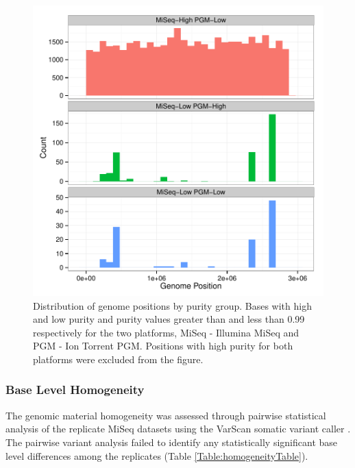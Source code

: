 \documentclass[smallextended]{svjour3}\usepackage[]{graphicx}\usepackage[]{color}
\makeatletter
\def\maxwidth{ %
  \ifdim\Gin@nat@width>\linewidth
    \linewidth
  \else
    \Gin@nat@width
  \fi
}
\newenvironment{knitrout}{}{} %
\makeatother
\begin{document}
\begin{knitrout}
\color{fgcolor}\begin{figure}

{\centering \includegraphics[width=\maxwidth]{figure/purityPositionFig-1} 

}

\caption[Distribution of genome positions by purity group]{Distribution of genome positions by purity group. Bases with high and low purity and purity values greater than and less than 0.99 respectively for the two platforms, MiSeq - Illumina MiSeq and PGM - Ion Torrent PGM.  Positions with high purity for both platforms were excluded from the figure.}\label{fig:purityPositionFig}
\end{figure}


\end{knitrout}


\subsubsection{Base Level Homogeneity}
The genomic material homogeneity was assessed through pairwise statistical analysis of the replicate MiSeq datasets using the VarScan somatic variant caller \cite{Koboldt2009}.  The pairwise variant analysis failed to identify any statistically significant base level differences among the replicates (Table \ref{Table:homogeneityTable}).
\end{document}
